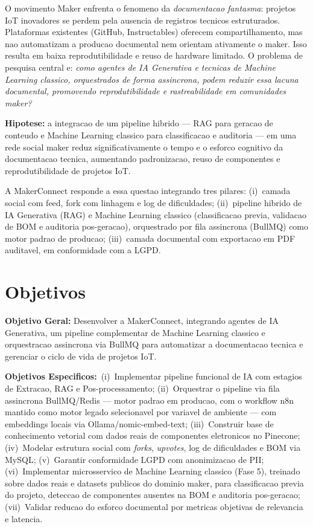 \documentclass[portuguese]{sbcreviews-2025}%
\begin{document}
O movimento Maker enfrenta o fenomeno da \textit{documentacao fantasma}: projetos IoT inovadores se perdem pela ausencia de registros tecnicos estruturados. Plataformas existentes (GitHub, Instructables) oferecem compartilhamento, mas nao automatizam a producao documental nem orientam ativamente o maker. Isso resulta em baixa reprodutibilidade e reuso de hardware limitado. O problema de pesquisa central e: \textit{como agentes de IA Generativa e tecnicas de Machine Learning classico, orquestrados de forma assincrona, podem reduzir essa lacuna documental, promovendo reprodutibilidade e rastreabilidade em comunidades maker?}

\textbf{Hipotese:} a integracao de um pipeline hibrido --- RAG para geracao de conteudo e Machine Learning classico para classificacao e auditoria --- em uma rede social maker reduz significativamente o tempo e o esforco cognitivo da documentacao tecnica, aumentando padronizacao, reuso de componentes e reprodutibilidade de projetos IoT.

A MakerConnect responde a essa questao integrando tres pilares: (i)~camada social com feed, fork com linhagem e log de dificuldades; (ii)~pipeline hibrido de IA Generativa (RAG) e Machine Learning classico (classificacao previa, validacao de BOM e auditoria pos-geracao), orquestrado por fila assincrona (BullMQ) como motor padrao de producao; (iii)~camada documental com exportacao em PDF auditavel, em conformidade com a LGPD.

\section{Objetivos}

\textbf{Objetivo Geral:} Desenvolver a MakerConnect, integrando agentes de IA Generativa, um pipeline complementar de Machine Learning classico e orquestracao assincrona via BullMQ para automatizar a documentacao tecnica e gerenciar o ciclo de vida de projetos IoT.

\textbf{Objetivos Especificos:}~(i)~Implementar pipeline funcional de IA com estagios de Extracao, RAG e Pos-processamento; (ii)~Orquestrar o pipeline via fila assincrona BullMQ/Redis --- motor padrao em producao, com o workflow n8n mantido como motor legado selecionavel por variavel de ambiente --- com embeddings locais via Ollama/nomic-embed-text; (iii)~Construir base de conhecimento vetorial com dados reais de componentes eletronicos no Pinecone; (iv)~Modelar estrutura social com \textit{forks}, \textit{upvotes}, log de dificuldades e BOM via MySQL; (v)~Garantir conformidade LGPD com anonimizacao de PII; (vi)~Implementar microsservico de Machine Learning classico (Fase 5), treinado sobre dados reais e datasets publicos do dominio maker, para classificacao previa do projeto, deteccao de componentes ausentes na BOM e auditoria pos-geracao; (vii)~Validar reducao do esforco documental por metricas objetivas de relevancia e latencia.
\end{document}
